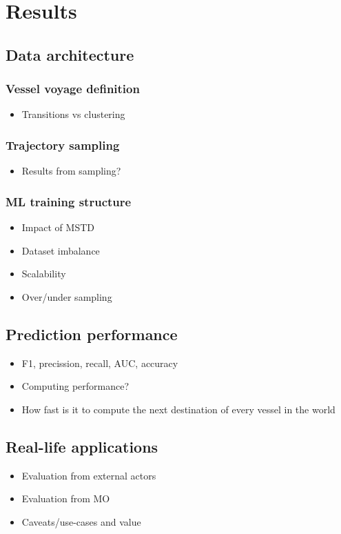 \chapter{Results}
\label{chap:results}

\section{Data architecture}

\subsection{Vessel voyage definition}

\begin{itemize}
    \item Transitions vs clustering
\end{itemize}

\subsection{Trajectory sampling}

\begin{itemize}
    \item Results from sampling?
\end{itemize}

\subsection{ML training structure}

\begin{itemize}
    \item Impact of MSTD
    \item Dataset imbalance
    \item Scalability
    \item Over/under sampling
\end{itemize}

\section{Prediction performance}

\begin{itemize}
    \item F1, precission, recall, AUC, accuracy
    \item Computing performance?
    \item How fast is it to compute the next destination of every vessel in the world
\end{itemize}

\section{Real-life applications}

\begin{itemize}
    \item Evaluation from external actors
    \item Evaluation from MO
    \item Caveats/use-cases and value
\end{itemize}
